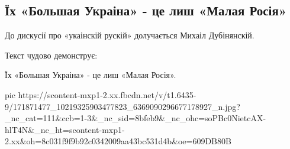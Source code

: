  
 
 
 
 
\subsection{Їх «Большая Украіна» - це  лиш «Малая Росія»}
\label{sec:10_04_2021.fb.vjatrovich_vladimir.2.ukraina_malorossia}

До дискусії про «укаінскій рускій» долучається Михаіл Дубінянскій. 

Текст чудово демонструє:

Їх «Большая Украіна» - це лиш «Малая Росія».

\ifcmt
  pic https://scontent-mxp1-2.xx.fbcdn.net/v/t1.6435-9/171871477_10219325903477823_6369090296677178927_n.jpg?_nc_cat=111&ccb=1-3&_nc_sid=8bfeb9&_nc_ohc=soPBc0NietcAX-hlT4N&_nc_ht=scontent-mxp1-2.xx&oh=8c031f9f9b92c0342009aa43bc531d4b&oe=609DB80B
\fi

